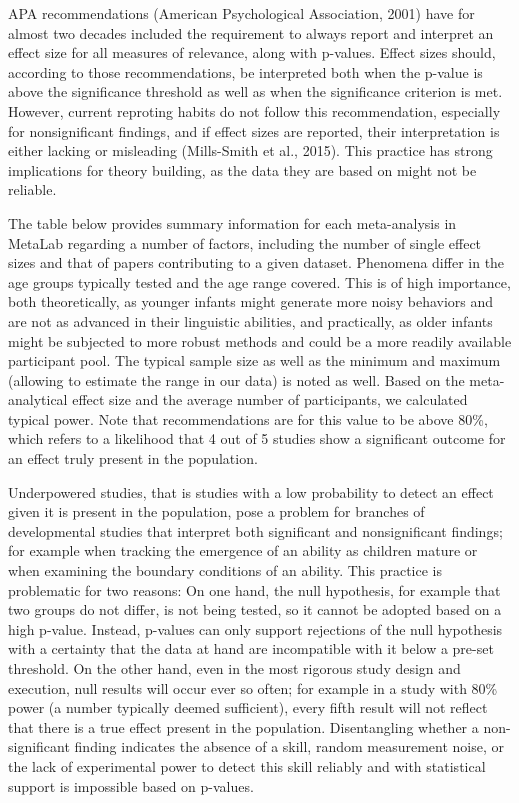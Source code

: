 \documentclass[english,floatsintext,man]{apa6}
\begin{document}
APA recommendations (American Psychological Association, 2001) have for
almost two decades included the requirement to always report and
interpret an effect size for all measures of relevance, along with
p-values. Effect sizes should, according to those recommendations, be
interpreted both when the p-value is above the significance threshold as
well as when the significance criterion is met. However, current
reproting habits do not follow this recommendation, especially for
nonsignificant findings, and if effect sizes are reported, their
interpretation is either lacking or misleading (Mills-Smith et al.,
2015). This practice has strong implications for theory building, as the
data they are based on might not be reliable.

The table below provides summary information for each meta-analysis in
MetaLab regarding a number of factors, including the number of single
effect sizes and that of papers contributing to a given dataset.
Phenomena differ in the age groups typically tested and the age range
covered. This is of high importance, both theoretically, as younger
infants might generate more noisy behaviors and are not as advanced in
their linguistic abilities, and practically, as older infants might be
subjected to more robust methods and could be a more readily available
participant pool. The typical sample size as well as the minimum and
maximum (allowing to estimate the range in our data) is noted as well.
Based on the meta-analytical effect size and the average number of
participants, we calculated typical power. Note that recommendations are
for this value to be above 80\%, which refers to a likelihood that 4 out
of 5 studies show a significant outcome for an effect truly present in
the population.

Underpowered studies, that is studies with a low probability to detect
an effect given it is present in the population, pose a problem for
branches of developmental studies that interpret both significant and
nonsignificant findings; for example when tracking the emergence of an
ability as children mature or when examining the boundary conditions of
an ability. This practice is problematic for two reasons: On one hand,
the null hypothesis, for example that two groups do not differ, is not
being tested, so it cannot be adopted based on a high p-value. Instead,
p-values can only support rejections of the null hypothesis with a
certainty that the data at hand are incompatible with it below a pre-set
threshold. On the other hand, even in the most rigorous study design and
execution, null results will occur ever so often; for example in a study
with 80\% power (a number typically deemed sufficient), every fifth
result will not reflect that there is a true effect present in the
population. Disentangling whether a non-significant finding indicates
the absence of a skill, random measurement noise, or the lack of
experimental power to detect this skill reliably and with statistical
support is impossible based on p-values.
\end{document}
